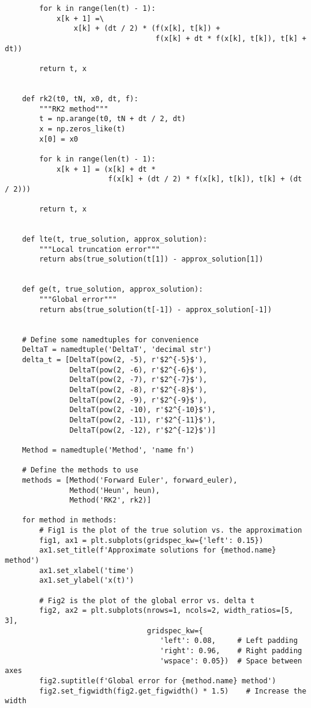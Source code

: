 \documentclass{article}
\begin{document}
\begin{verbatim}
        for k in range(len(t) - 1):
            x[k + 1] =\
                x[k] + (dt / 2) * (f(x[k], t[k]) +
                                   f(x[k] + dt * f(x[k], t[k]), t[k] + dt))
    
        return t, x
    
    
    def rk2(t0, tN, x0, dt, f):
        """RK2 method"""
        t = np.arange(t0, tN + dt / 2, dt)
        x = np.zeros_like(t)
        x[0] = x0
    
        for k in range(len(t) - 1):
            x[k + 1] = (x[k] + dt *
                        f(x[k] + (dt / 2) * f(x[k], t[k]), t[k] + (dt / 2)))
    
        return t, x
    
    
    def lte(t, true_solution, approx_solution):
        """Local truncation error"""
        return abs(true_solution(t[1]) - approx_solution[1])
    
    
    def ge(t, true_solution, approx_solution):
        """Global error"""
        return abs(true_solution(t[-1]) - approx_solution[-1])
    
    
    # Define some namedtuples for convenience
    DeltaT = namedtuple('DeltaT', 'decimal str')
    delta_t = [DeltaT(pow(2, -5), r'$2^{-5}$'),
               DeltaT(pow(2, -6), r'$2^{-6}$'),
               DeltaT(pow(2, -7), r'$2^{-7}$'),
               DeltaT(pow(2, -8), r'$2^{-8}$'),
               DeltaT(pow(2, -9), r'$2^{-9}$'),
               DeltaT(pow(2, -10), r'$2^{-10}$'),
               DeltaT(pow(2, -11), r'$2^{-11}$'),
               DeltaT(pow(2, -12), r'$2^{-12}$')]
    
    Method = namedtuple('Method', 'name fn')
    
    # Define the methods to use
    methods = [Method('Forward Euler', forward_euler),
               Method('Heun', heun),
               Method('RK2', rk2)]
    
    for method in methods:
        # Fig1 is the plot of the true solution vs. the approximation
        fig1, ax1 = plt.subplots(gridspec_kw={'left': 0.15})
        ax1.set_title(f'Approximate solutions for {method.name} method')
        ax1.set_xlabel('time')
        ax1.set_ylabel('x(t)')
    
        # Fig2 is the plot of the global error vs. delta t
        fig2, ax2 = plt.subplots(nrows=1, ncols=2, width_ratios=[5, 3],
                                 gridspec_kw={
                                    'left': 0.08,     # Left padding
                                    'right': 0.96,    # Right padding
                                    'wspace': 0.05})  # Space between axes
        fig2.suptitle(f'Global error for {method.name} method')
        fig2.set_figwidth(fig2.get_figwidth() * 1.5)    # Increase the width
    

\end{verbatim}
\end{document}
